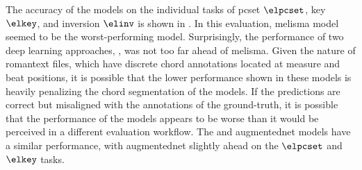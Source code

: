 

The accuracy of the models on the individual tasks of
\gls{pcset} $\elpcset$, key $\elkey$, and inversion $\elinv$
is shown in . In this evaluation,
\gls{melisma} model seemed to be the worst-performing model.
Surprisingly, the performance of two deep learning
approaches, \textcite{mcleod2021modular,chen2021attend}, was
not too far ahead of \gls{melisma}. Given the nature of
\gls{romantext} files, which have discrete chord annotations
located at measure and beat positions, it is possible that
the lower performance shown in these models is heavily
penalizing the chord segmentation of the models. If the
predictions are correct but misaligned with the annotations
of the ground-truth, it is possible that the performance of
the models appears to be worse than it would be perceived in
a different evaluation workflow. The
\textcite{micchi2021deep} and \gls{augmentednet} models have
a similar performance, with \gls{augmentednet} slightly
ahead on the $\elpcset$ and $\elkey$ tasks.

